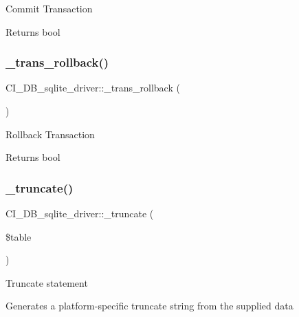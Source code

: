 Commit Transaction

\begin{DoxyReturn}{Returns}
bool 
\end{DoxyReturn}
\mbox{\label{class_c_i___d_b__sqlite__driver_a5e34c38beb3e58dc237b132b38867376}} 
\subsubsection{\texorpdfstring{\+\_\+trans\+\_\+rollback()}{\_trans\_rollback()}}
{\footnotesize\ttfamily C\+I\+\_\+\+D\+B\+\_\+sqlite\+\_\+driver\+::\+\_\+trans\+\_\+rollback (\begin{DoxyParamCaption}{ }\end{DoxyParamCaption})\hspace{0.3cm}{\ttfamily [protected]}}

Rollback Transaction

\begin{DoxyReturn}{Returns}
bool 
\end{DoxyReturn}
\mbox{\label{class_c_i___d_b__sqlite__driver_a4fddd9667da38303cc53d30ad8a53c83}} 
\subsubsection{\texorpdfstring{\+\_\+truncate()}{\_truncate()}}
{\footnotesize\ttfamily C\+I\+\_\+\+D\+B\+\_\+sqlite\+\_\+driver\+::\+\_\+truncate (\begin{DoxyParamCaption}\item[{}]{\$table }\end{DoxyParamCaption})\hspace{0.3cm}{\ttfamily [protected]}}

Truncate statement

Generates a platform-\/specific truncate string from the supplied data


